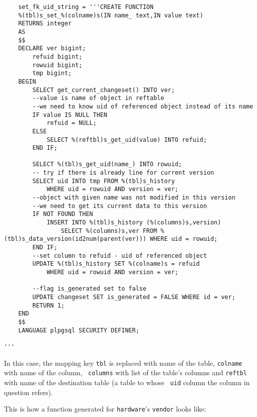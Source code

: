 \documentclass[deska]{subfiles}
\begin{document}
\begin{verbatim}
    set_fk_uid_string = '''CREATE FUNCTION
    %(tbl)s_set_%(colname)s(IN name_ text,IN value text)
    RETURNS integer
    AS
    $$
    DECLARE ver bigint;
        refuid bigint;
        rowuid bigint;
        tmp bigint;
    BEGIN
        SELECT get_current_changeset() INTO ver;
        --value is name of object in reftable
        --we need to know uid of referenced object instead of its name
        IF value IS NULL THEN
            refuid = NULL;
        ELSE
            SELECT %(reftbl)s_get_uid(value) INTO refuid;
        END IF;

        SELECT %(tbl)s_get_uid(name_) INTO rowuid;
        -- try if there is already line for current version
        SELECT uid INTO tmp FROM %(tbl)s_history
            WHERE uid = rowuid AND version = ver;
        --object with given name was not modified in this version
        --we need to get its current data to this version
        IF NOT FOUND THEN
            INSERT INTO %(tbl)s_history (%(columns)s,version)
                SELECT %(columns)s,ver FROM %(tbl)s_data_version(id2num(parent(ver))) WHERE uid = rowuid;
        END IF;
        --set column to refuid - uid of referenced object
        UPDATE %(tbl)s_history SET %(colname)s = refuid
            WHERE uid = rowuid AND version = ver;

        --flag is_generated set to false
        UPDATE changeset SET is_generated = FALSE WHERE id = ver;
        RETURN 1;
    END
    $$
    LANGUAGE plpgsql SECURITY DEFINER;

'''
\end{verbatim}

In this case, the mapping key {\tt tbl} is replaced with name of the table, {\tt colname} with name of the column, {\tt
columns} with list of the table's columns and {\tt reftbl} with name of the destination table (a table to whose {\tt
uid} column the column in question refers).

This is how a function generated for {\tt hardware}'s {\tt vendor} looks like:
\end{document}
